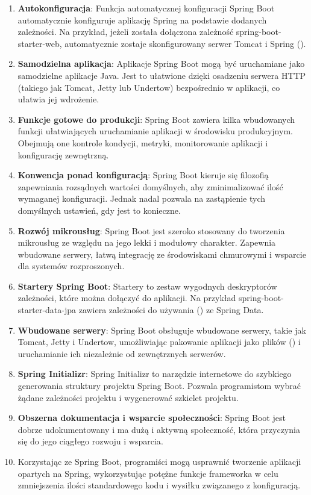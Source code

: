 \begin{enumerate}
    \item \textbf{Autokonfiguracja}: Funkcja automatycznej konfiguracji Spring Boot automatycznie konfiguruje aplikację Spring na podstawie dodanych zależności. Na przykład, jeżeli została dołączona zależność spring-boot-starter-web, automatycznie zostaje skonfigurowany serwer Tomcat i Spring  ()\cite{springbootFeatures}.
    \item \textbf{Samodzielna aplikacja}: Aplikacje Spring Boot mogą być uruchamiane jako samodzielne aplikacje Java. Jest to ułatwione dzięki osadzeniu serwera HTTP (takiego jak Tomcat, Jetty lub Undertow) bezpośrednio w aplikacji, co ułatwia jej wdrożenie\cite{springbootFeatures}.
    \item \textbf{Funkcje gotowe do produkcji}: Spring Boot zawiera kilka wbudowanych funkcji ułatwiających uruchamianie aplikacji w środowisku produkcyjnym. Obejmują one kontrole kondycji, metryki, monitorowanie aplikacji i konfigurację zewnętrzną\cite{springbootFeatures}.
    \item \textbf{Konwencja ponad konfiguracją}: Spring Boot kieruje się filozofią zapewniania rozsądnych wartości domyślnych, aby zminimalizować ilość wymaganej konfiguracji. Jednak nadal pozwala na zastąpienie tych domyślnych ustawień, gdy jest to konieczne\cite{springbootFeatures}.
    \item \textbf{Rozwój mikrousług}: Spring Boot jest szeroko stosowany do tworzenia mikrousług ze względu na jego lekki i modułowy charakter. Zapewnia wbudowane serwery, łatwą integrację ze środowiskami chmurowymi i wsparcie dla systemów rozproszonych\cite{springbootFeatures}.
    \item \textbf{Startery Spring Boot}: Startery to zestaw wygodnych deskryptorów zależności, które można dołączyć do aplikacji. Na przykład spring-boot-starter-data-jpa zawiera zależności do używania  () ze Spring Data\cite{springbootFeatures}.
    \item \textbf{Wbudowane serwery}: Spring Boot obsługuje wbudowane serwery, takie jak Tomcat, Jetty i Undertow, umożliwiając pakowanie aplikacji jako plików  () i uruchamianie ich niezależnie od zewnętrznych serwerów\cite{springbootFeatures}.
    \item \textbf{Spring Initializr}: Spring Initializr to narzędzie internetowe do szybkiego generowania struktury projektu Spring Boot. Pozwala programistom wybrać żądane zależności projektu i wygenerować szkielet projektu\cite{springbootFeatures}.
    \item \textbf{Obszerna dokumentacja i wsparcie społeczności}: Spring Boot jest dobrze udokumentowany i ma dużą i aktywną społeczność, która przyczynia się do jego ciągłego rozwoju i wsparcia\cite{springbootFeatures}.
    \item Korzystając ze Spring Boot, programiści mogą usprawnić tworzenie aplikacji opartych na Spring, wykorzystując potężne funkcje frameworka w celu zmniejszenia ilości standardowego kodu i wysiłku związanego z konfiguracją\cite{springbootFeatures}.
\end{enumerate}


